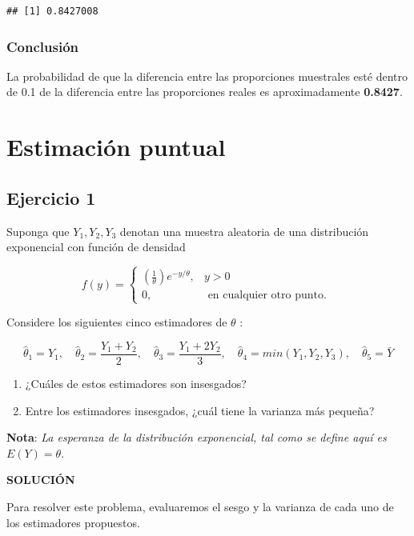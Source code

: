 \documentclass[
]{article}
\providecommand{\tightlist}{%
  \setlength{\itemsep}{0pt}\setlength{\parskip}{0pt}}
\begin{document}
\begin{verbatim}
## [1] 0.8427008
\end{verbatim}

\subsubsection{Conclusión}\label{conclusiuxf3n-3}

La probabilidad de que la diferencia entre las proporciones muestrales esté dentro de 0.1 de la diferencia entre las proporciones reales es aproximadamente \textbf{0.8427}.

\section{Estimación puntual}\label{estimaciuxf3n-puntual}

\subsection{Ejercicio 1}\label{ejercicio-1-2}

Suponga que \(Y_{1}, Y_{2}, Y_{3}\) denotan una muestra aleatoria de una distribución exponencial con función de densidad

\[
f(y)= \begin{cases}\left(\frac{1}{\theta}\right) e^{-y / \theta}, & y>0 \\ 0, & \text { en cualquier otro punto. }\end{cases}
\]

Considere los siguientes cinco estimadores de \(\theta\) :

\[
\hat{\theta}_{1}=Y_{1}, \quad \hat{\theta}_{2}=\frac{Y_{1}+Y_{2}}{2}, \quad \hat{\theta}_{3}=\frac{Y_{1}+2 Y_{2}}{3}, \quad \hat{\theta}_{4}=min\left(Y_{1}, Y_{2}, Y_{3}\right), \quad \hat{\theta}_{5}=\bar{Y}
\]

\begin{enumerate}
\def\labelenumi{\alph{enumi}.}
\tightlist
\item
  ¿Cuáles de estos estimadores son insesgados?
\item
  Entre los estimadores insesgados, ¿cuál tiene la varianza más pequeña?
\end{enumerate}

\textbf{Nota}: \emph{La esperanza de la distribución exponencial, tal como se define aquí es \(E(Y)= \theta\)}.

\textbf{SOLUCIÓN}

Para resolver este problema, evaluaremos el sesgo y la varianza de cada uno de los estimadores propuestos.
\end{document}
